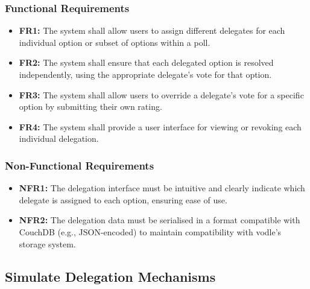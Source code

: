 \subsubsection{Functional Requirements}
\begin{itemize}
    \item \textbf{FR1:} The system shall allow users to assign different delegates for each individual option or subset of options within a poll.

    \item \textbf{FR2:} The system shall ensure that each delegated option is resolved independently, using the appropriate delegate's vote for that option.

    \item \textbf{FR3:} The system shall allow users to override a delegate's vote for a specific option by submitting their own rating.

    \item \textbf{FR4:} The system shall provide a user interface for viewing or revoking each individual delegation.
\end{itemize}

\subsubsection{Non-Functional Requirements}
\begin{itemize}
    \item \textbf{NFR1:} The delegation interface must be intuitive and clearly indicate which delegate is assigned to each option, ensuring ease of use.

    \item \textbf{NFR2:} The delegation data must be serialised in a format compatible with CouchDB (e.g., JSON-encoded) to maintain compatibility with vodle's storage system.
\end{itemize}
\subsection{Simulate Delegation Mechanisms}\label{subsec:requirements_sim}
